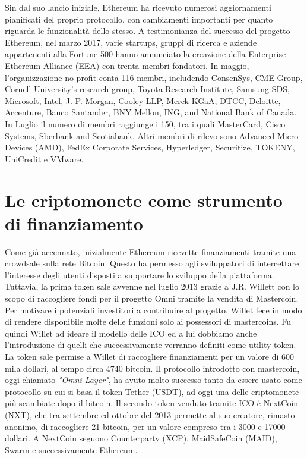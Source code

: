 Sin dal suo lancio iniziale, Ethereum ha ricevuto numerosi aggiornamenti pianificati del proprio protocollo, con cambiamenti importanti per quanto riguarda le funzionalità dello stesso. 
A testimonianza del successo del progetto Ethereum, nel marzo 2017, varie startups, gruppi di ricerca e aziende appartenenti alla Fortune 500 hanno annunciato la creazione della Enterprise Ethereum Alliance (EEA) con trenta membri fondatori. 
In maggio, l'organizzazione no-profit conta 116 membri, includendo ConsenSys, CME Group, Cornell University's research group, Toyota Research Institute, Samsung SDS, Microsoft, Intel, J. P. Morgan, Cooley LLP, Merck KGaA, DTCC, Deloitte, Accenture, Banco Santander, BNY Mellon, ING, and National Bank of Canada.
In Luglio il numero di membri raggiunge i 150, tra i quali MasterCard, Cisco Systems, Sberbank and Scotiabank. Altri membri di rilevo sono Advanced Micro Devices (AMD), FedEx Corporate Services, Hyperledger, Securitize, TOKENY, UniCredit e VMware.

\section{Le criptomonete come strumento di finanziamento}
Come già accennato, inizialmente Ethereum ricevette finanziamenti tramite una crowdsale sulla rete Bitcoin.  Questo ha permesso agli sviluppatori di intercettare l'interesse degli utenti disposti a supportare lo sviluppo della piattaforma. Tuttavia, la prima token sale avvenne nel luglio 2013 grazie a J.R. Willett con lo scopo di raccogliere fondi per il progetto Omni tramite la vendita di Mastercoin\cite{K23}. Per motivare i potenziali investitori a contribuire al progetto, Willet fece in modo di rendere disponibile molte delle funzioni solo ai possessori di mastercoins. Fu quindi Willet ad ideare il modello delle ICO ed a lui dobbiamo anche l'introduzione di quelli che successivamente verranno definiti come utility token. La token sale permise a Willet di raccogliere finanziamenti per un valore di 600 mila dollari, al tempo circa 4740 bitcoin. Il protocollo introdotto con mastercoin, oggi chiamato \textit{"Omni Layer"}, ha avuto molto successo tanto da essere usato come protocollo su cui si basa il token Tether (USDT), ad oggi una delle criptomonete più scambiate dopo il bitcoin\cite{K24}. 
Il secondo token venduto tramite ICO è NextCoin (NXT), che tra settembre ed ottobre del 2013 permette al suo creatore, rimasto anonimo, di raccogliere 21 bitcoin, per un valore compreso tra i 3000 e 17000 dollari. A NextCoin seguono Counterparty (XCP), MaidSafeCoin (MAID), Swarm e successivamente Ethereum.\cite{K25,K26,K27,K28}

